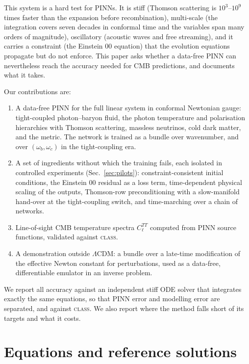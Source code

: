 \documentclass[prd,twocolumn,superscriptaddress,nofootinbib,floatfix]{revtex4-2}
\begin{document}
This system is a hard test for PINNs. It is stiff (Thomson scattering is $10^{3}$--$10^{9}$ times faster than the expansion before recombination), multi-scale (the integration covers seven decades in conformal time and the variables span many orders of magnitude), oscillatory (acoustic waves and free streaming), and it carries a constraint (the Einstein $00$ equation) that the evolution equations propagate but do not enforce. This paper asks whether a data-free PINN can nevertheless reach the accuracy needed for CMB predictions, and documents what it takes.

Our contributions are:
\begin{enumerate}
\item A data-free PINN for the full linear system in conformal Newtonian gauge: tight-coupled photon--baryon fluid, the photon temperature and polarisation hierarchies with Thomson scattering, massless neutrinos, cold dark matter, and the metric. The network is trained as a bundle over wavenumber, and over $(\omega_b,\omega_c)$ in the tight-coupling era.
\item A set of ingredients without which the training fails, each isolated in controlled experiments (Sec.~\ref{sec:pilots}): constraint-consistent initial conditions, the Einstein $00$ residual as a loss term, time-dependent physical scaling of the outputs, Thomson-row preconditioning with a slow-manifold hand-over at the tight-coupling switch, and time-marching over a chain of networks.
\item Line-of-sight CMB temperature spectra $C_\ell^{TT}$ computed from PINN source functions, validated against \textsc{class}.
\item A demonstration outside $\Lambda$CDM: a bundle over a late-time modification of the effective Newton constant for perturbations, used as a data-free, differentiable emulator in an inverse problem.
\end{enumerate}
We report all accuracy against an independent stiff ODE solver that integrates exactly the same equations, so that PINN error and modelling error are separated, and against \textsc{class}. We also report where the method falls short of its targets and what it costs.

\section{Equations and reference solutions}\label{sec:equations}
\end{document}
